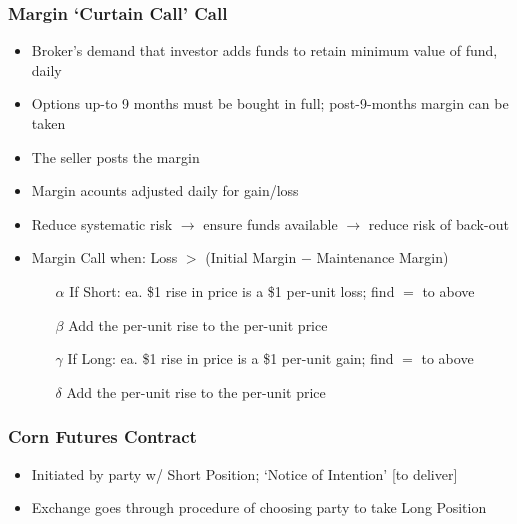 \documentclass[11pt, english]{article}
\begin{document}
		\subsubsection{Margin `Curtain Call' Call}
	
	\begin{itemize}                           
        \setlength\itemsep{0cm}
		\item Broker's demand that investor adds funds to retain minimum value of fund, daily
		\item Options up-to 9 months must be bought in full; post-9-months margin can be taken
		\item The seller posts the margin
		\item Margin acounts adjusted daily for gain/loss
		\item Reduce systematic risk $\rightarrow$ ensure funds available $\rightarrow$ reduce risk of back-out
	\end{itemize}

	\begin{itemize}                                                
        \setlength\itemsep{0cm}
		\item Margin Call when: Loss $>$ (Initial Margin $-$ Maintenance Margin)
		\begin{itemize}
			\item[$\alpha$] If Short: ea. \$1 rise in price is a \$1 per-unit loss; find $=$ to above
			\item[$\beta$] Add the per-unit rise to the per-unit price
			\item[$\gamma$] If Long: ea. \$1 rise in price is a \$1 per-unit gain; find $=$ to above
			\item[$\delta$] Add the per-unit rise to the per-unit price
		\end{itemize}
	\end{itemize}

		\subsubsection{Corn Futures Contract}

	\begin{itemize}        
        \setlength\itemsep{0cm}
		\item Initiated by party w/ Short Position; `Notice of Intention' [to deliver]
		\item Exchange goes through procedure of choosing party to take Long Position
	\end{itemize}
\end{document}
